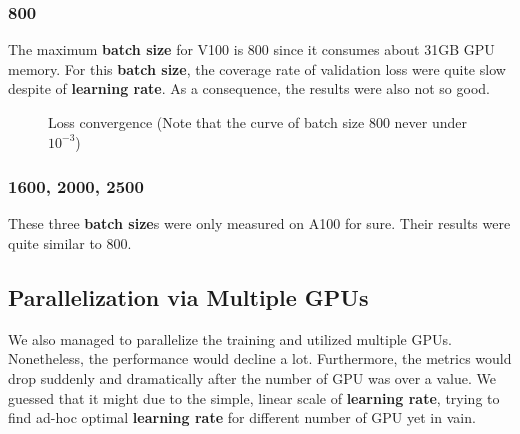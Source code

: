 \documentclass[
]{article}
\begin{document}
\hypertarget{section-4}{%
\subsubsection{800}\label{section-4}}

The maximum \textbf{batch size} for V100 is 800 since it consumes about
31GB GPU memory. For this \textbf{batch size}, the coverage rate of
validation loss were quite slow despite of \textbf{learning rate}. As a
consequence, the results were also not so good.

\begin{figure}[htbp]
\centering
{}
\caption{Loss convergence (Note that the curve of batch size 800 never under $10^{-3}$)}
\end{figure}

\hypertarget{section-5}{%
\subsubsection{1600, 2000, 2500}\label{section-5}}

These three \textbf{batch size}s were only measured on A100 for sure.
Their results were quite similar to 800.

\hypertarget{parallelization-via-multiple-gpus}{%
\subsection{Parallelization via Multiple
GPUs}\label{parallelization-via-multiple-gpus}}

We also managed to parallelize the training and utilized multiple GPUs.
Nonetheless, the performance would decline a lot. Furthermore, the
metrics would drop suddenly and dramatically after the number of GPU was
over a value. We guessed that it might due to the simple, linear scale
of \textbf{learning rate}, trying to find ad-hoc optimal
\textbf{learning rate} for different number of GPU yet in vain.
\end{document}
